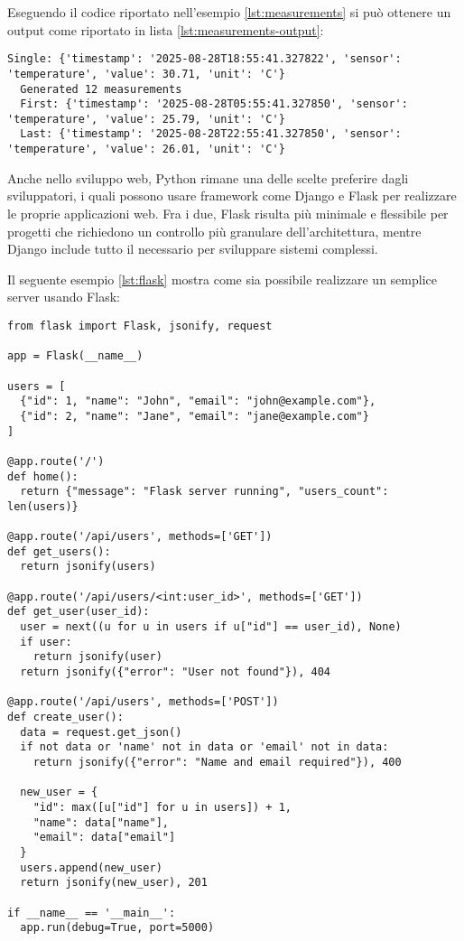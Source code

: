 Eseguendo il codice riportato nell'esempio \ref{lst:measurements} si può ottenere un output come riportato
in lista \ref{lst:measurements-output}:
\begin{lstlisting}[caption={Output di esempio ottenuto dalla generazione di misurazioni aleatorie in Python},
  label=lst:measurements-output]
  Single: {'timestamp': '2025-08-28T18:55:41.327822', 'sensor': 'temperature', 'value': 30.71, 'unit': 'C'}
  Generated 12 measurements
  First: {'timestamp': '2025-08-28T05:55:41.327850', 'sensor': 'temperature', 'value': 25.79, 'unit': 'C'}
  Last: {'timestamp': '2025-08-28T22:55:41.327850', 'sensor': 'temperature', 'value': 26.01, 'unit': 'C'}
\end{lstlisting}

Anche nello sviluppo web, Python rimane una delle scelte preferire dagli sviluppatori, i quali possono usare framework
come Django e Flask \citep{django_2023, flask_2023} per realizzare le proprie applicazioni web.
Fra i due, Flask risulta più minimale e flessibile per progetti che richiedono un controllo più granulare
dell'architettura, mentre Django include tutto il necessario per sviluppare sistemi complessi.

Il seguente esempio \ref{lst:flask} mostra come sia possibile realizzare un semplice server usando Flask:

\begin{lstlisting}[caption={Server Flask base in Python}, label=lst:flask]
from flask import Flask, jsonify, request

app = Flask(__name__)

users = [
  {"id": 1, "name": "John", "email": "john@example.com"},
  {"id": 2, "name": "Jane", "email": "jane@example.com"}
]

@app.route('/')
def home():
  return {"message": "Flask server running", "users_count": len(users)}

@app.route('/api/users', methods=['GET'])
def get_users():
  return jsonify(users)

@app.route('/api/users/<int:user_id>', methods=['GET'])
def get_user(user_id):
  user = next((u for u in users if u["id"] == user_id), None)
  if user:
    return jsonify(user)
  return jsonify({"error": "User not found"}), 404

@app.route('/api/users', methods=['POST'])
def create_user():
  data = request.get_json()
  if not data or 'name' not in data or 'email' not in data:
    return jsonify({"error": "Name and email required"}), 400

  new_user = {
    "id": max([u["id"] for u in users]) + 1,
    "name": data["name"],
    "email": data["email"]
  }
  users.append(new_user)
  return jsonify(new_user), 201

if __name__ == '__main__':
  app.run(debug=True, port=5000)
\end{lstlisting}

